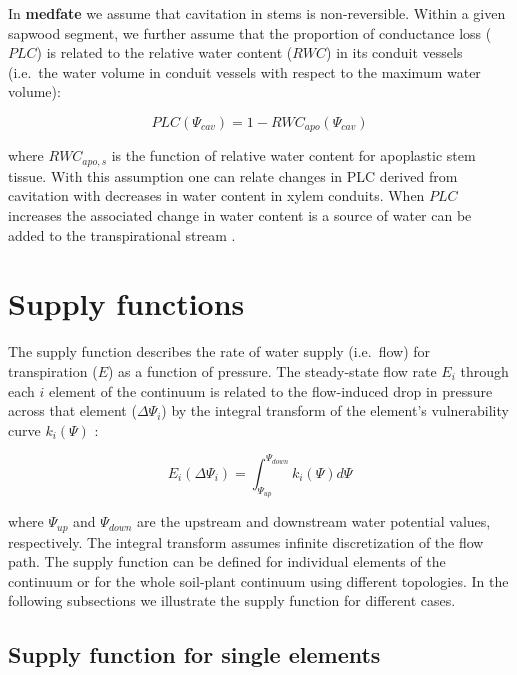 \documentclass[]{book}
\begin{document}
In \textbf{medfate} we assume that cavitation in stems is
non-reversible. Within a given sapwood segment, we further assume that
the proportion of conductance loss (\(PLC\)) is related to the relative
water content (\(RWC\)) in its conduit vessels (i.e.~the water volume in
conduit vessels with respect to the maximum water volume):

\begin{equation}
PLC(\Psi_{cav}) = 1 - RWC_{apo}(\Psi_{cav})
\end{equation}

where \(RWC_{apo,s}\) is the function of relative water content for
apoplastic stem tissue. With this assumption one can relate changes in
PLC derived from cavitation with decreases in water content in xylem
conduits. When \(PLC\) increases the associated change in water content
is a source of water can be added to the transpirational stream
\citep{Martin-StPaul2017}.

\section{Supply functions}\label{supply-functions}

The supply function describes the rate of water supply (i.e.~flow) for
transpiration (\(E\)) as a function of pressure. The steady-state flow
rate \(E_i\) through each \(i\) element of the continuum is related to
the flow-induced drop in pressure across that element
(\(\Delta \Psi_i\)) by the integral transform of the element's
vulnerability curve \(k_i(\Psi)\) \citep{Sperry2015}:

\begin{equation}
E_i(\Delta \Psi_i) = \int_{\Psi_{up}}^{\Psi_{down}}{k_i(\Psi) d\Psi}
\label{eq:generalsupply}
\end{equation}

where \(\Psi_{up}\) and \(\Psi_{down}\) are the upstream and downstream
water potential values, respectively. The integral transform assumes
infinite discretization of the flow path. The supply function can be
defined for individual elements of the continuum or for the whole
soil-plant continuum using different topologies. In the following
subsections we illustrate the supply function for different cases.

\subsection{Supply function for single
elements}\label{supply-function-for-single-elements}
\end{document}
